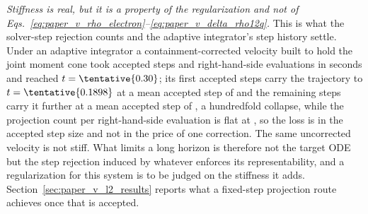\emph{Stiffness is real, but it is a property of the regularization and not of
Eqs.~\eqref{eq:paper_v_rho_electron}--\eqref{eq:paper_v_delta_rho12q}.}  This
is what the solver-step rejection counts and the adaptive integrator's step
history settle.  Under an adaptive integrator a containment-corrected velocity
built to hold the joint moment cone took  accepted
steps and  right-hand-side evaluations in
 seconds and reached \(t=\tentative{0.30}\); its first
 accepted steps carry the trajectory to
\(t=\tentative{0.1898}\) at a mean accepted step of
 and the remaining 
steps carry it  further at a mean accepted step of
, a hundredfold collapse, while the projection
count per right-hand-side evaluation is flat at , so the
loss is in the accepted step size and not in the price of one correction.  The
same uncorrected velocity is not stiff.  What limits a long horizon is
therefore not the target ODE but the step rejection induced by whatever
enforces its representability, and a regularization for this system is to be
judged on the stiffness it adds.
Section~\ref{sec:paper_v_l2_results} reports what a fixed-step projection
route achieves once that is accepted.



